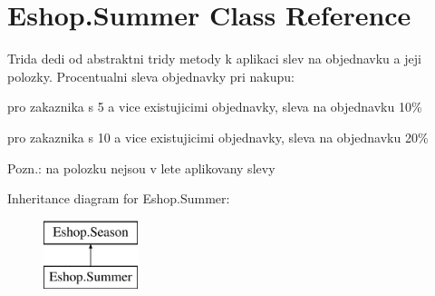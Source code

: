\hypertarget{class_eshop_1_1_summer}{}\section{Eshop.\+Summer Class Reference}
\label{class_eshop_1_1_summer}


Trida dedi od abstraktni tridy metody k aplikaci slev na objednavku a jeji polozky. Procentualni sleva objednavky pri nakupu\+: 
\begin{DoxyItemize}
\item pro zakaznika s 5 a vice existujicimi objednavky, sleva na objednavku 10\%  
\item pro zakaznika s 10 a vice existujicimi objednavky, sleva na objednavku 20\%  
\end{DoxyItemize}Pozn.\+: na polozku nejsou v lete aplikovany slevy  


Inheritance diagram for Eshop.\+Summer\+:\begin{figure}[H]
\begin{center}
\leavevmode
\includegraphics[height=2.000000cm]{class_eshop_1_1_summer}
\end{center}
\end{figure}
